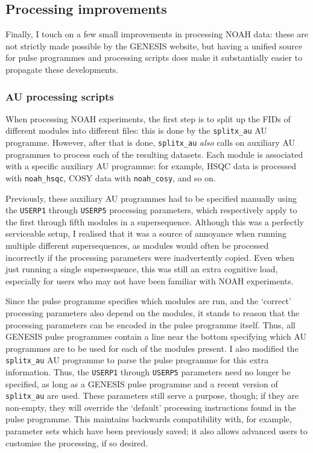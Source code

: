 \subsection{Processing improvements}
\label{subsec:noah__genesis_processing}

Finally, I touch on a few small improvements in processing NOAH data: these are not strictly made possible by the GENESIS website, but having a unified source for pulse programmes and processing scripts does make it substantially easier to propagate these developments.


\subsubsection{AU processing scripts}

When processing NOAH experiments, the first step is to split up the FIDs of different modules into different files: this is done by the \texttt{splitx\_au} AU programme.
However, after that is done, \texttt{splitx\_au} \textit{also} calls on auxiliary AU programmes to process each of the resulting datasets.
Each module is associated with a specific auxiliary AU programme: for example, HSQC data is processed with \texttt{noah\_hsqc}, COSY data with \texttt{noah\_cosy}, and so on.

Previously, these auxiliary AU programmes had to be specified manually using the \texttt{USERP1} through \texttt{USERP5} processing parameters, which respectively apply to the first through fifth modules in a supersequence.
Although this was a perfectly serviceable setup, I realised that it was a source of annoyance when running multiple different supersequences, as modules would often be processed incorrectly if the processing parameters were inadvertently copied.
Even when just running a single supersequence, this was still an extra cognitive load, especially for users who may not have been familiar with NOAH experiments.

Since the pulse programme specifies which modules are run, and the `correct' processing parameters also depend on the modules, it stands to reason that the processing parameters can be encoded in the pulse programme itself.
Thus, all GENESIS pulse programmes contain a line near the bottom specifying which AU programmes are to be used for each of the modules present.
I also modified the \texttt{splitx\_au} AU programme to parse the pulse programme for this extra information.
Thus, the \texttt{USERP1} through \texttt{USERP5} parameters need no longer be specified, as long as a GENESIS pulse programme and a recent version of \texttt{splitx\_au} are used.
These parameters still serve a purpose, though; if they are non-empty, they will override the `default' processing instructions found in the pulse programme.
This maintains backwards compatibility with, for example, parameter sets which have been previously saved; it also allows advanced users to customise the processing, if so desired.


